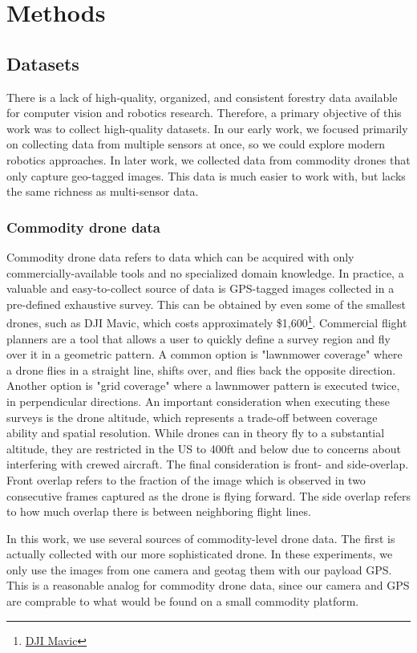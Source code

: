 \chapter{Methods} \label{chapMethod}
\section{Datasets}
There is a lack of high-quality, organized, and consistent forestry data available for computer vision and robotics research. Therefore, a primary objective of this work was to collect high-quality datasets. In our early work, we focused primarily on collecting data from multiple sensors at once, so we could explore modern robotics approaches. In later work, we collected data from commodity drones that only capture geo-tagged images. This data is much easier to work with, but lacks the same richness as multi-sensor data.

\subsection{Commodity drone data}
Commodity drone data refers to data which can be acquired with only commercially-available tools and no specialized domain knowledge. In practice, a valuable and easy-to-collect source of data is GPS-tagged images collected in a pre-defined exhaustive survey. This can be obtained by even some of the smallest drones, such as DJI Mavic, which costs approximately \$1,600\footnote{\href{https://store.dji.com/product/dji-mavic-3-classic}{DJI Mavic}}. Commercial flight planners are a tool that allows a user to quickly define a survey region and fly over it in a geometric pattern. A common option is "lawnmower coverage" where a drone flies in a straight line, shifts over, and flies back the opposite direction. Another option is "grid coverage" where a lawnmower pattern is executed twice, in perpendicular directions. An important consideration when executing these surveys is the drone altitude, which represents a trade-off between coverage ability and spatial resolution. While drones can in theory fly to a substantial altitude, they are restricted in the US to 400ft and below due to concerns about interfering with crewed aircraft. The final consideration is front- and side-overlap. Front overlap refers to the fraction of the image which is observed in two consecutive frames captured as the drone is flying forward. The side overlap refers to how much overlap there is between neighboring flight lines.

In this work, we use several sources of commodity-level drone data. The first is actually collected with our more sophisticated drone. In these experiments, we only use the images from one camera and geotag them with our payload GPS. This is a reasonable analog for commodity drone data, since our camera and GPS are comprable to what would be found on a small commodity platform. 

